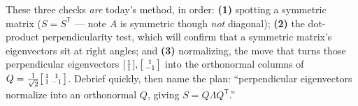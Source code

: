 \documentclass[10pt]{article}
\begin{document}
\begin{teachernote}
These three checks \emph{are} today's method, in order: \textbf{(1)} spotting a symmetric matrix
($S=S^{\mathsf T}$ --- note $A$ is symmetric though \emph{not} diagonal); \textbf{(2)} the dot-product
perpendicularity test, which will confirm that a symmetric matrix's eigenvectors sit at right angles; and
\textbf{(3)} normalizing, the move that turns those perpendicular eigenvectors
$\begin{bsmallmatrix}1\\1\end{bsmallmatrix},\begin{bsmallmatrix}1\\-1\end{bsmallmatrix}$ into the orthonormal
columns of $Q=\frac{1}{\sqrt2}\begin{bsmallmatrix}1&1\\1&-1\end{bsmallmatrix}$. Debrief quickly, then name the
plan: ``perpendicular eigenvectors normalize into an orthonormal $Q$, giving $S=Q\Lambda Q^{\mathsf T}$.''
\end{teachernote}
\end{document}
